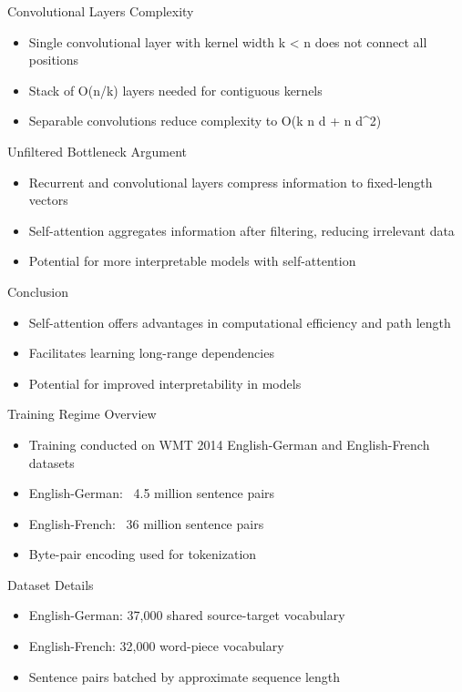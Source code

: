 \documentclass{beamer}
\begin{document}
\begin{frame}{Convolutional Layers Complexity}
\begin{itemize}
\item Single convolutional layer with kernel width k < n does not connect all positions
\item Stack of O(n/k) layers needed for contiguous kernels
\item Separable convolutions reduce complexity to O(k n d + n d^2)
\end{itemize}
\end{frame}

\begin{frame}{Unfiltered Bottleneck Argument}
\begin{itemize}
\item Recurrent and convolutional layers compress information to fixed-length vectors
\item Self-attention aggregates information after filtering, reducing irrelevant data
\item Potential for more interpretable models with self-attention
\end{itemize}
\end{frame}

\begin{frame}{Conclusion}
\begin{itemize}
\item Self-attention offers advantages in computational efficiency and path length
\item Facilitates learning long-range dependencies
\item Potential for improved interpretability in models
\end{itemize}
\end{frame}

\begin{frame}{Training Regime Overview}
\begin{itemize}
\item Training conducted on WMT 2014 English-German and English-French datasets
\item English-German: ~4.5 million sentence pairs
\item English-French: ~36 million sentence pairs
\item Byte-pair encoding used for tokenization
\end{itemize}
\end{frame}

\begin{frame}{Dataset Details}
\begin{itemize}
\item English-German: 37,000 shared source-target vocabulary
\item English-French: 32,000 word-piece vocabulary
\item Sentence pairs batched by approximate sequence length
\end{itemize}
\end{frame}
\end{document}
